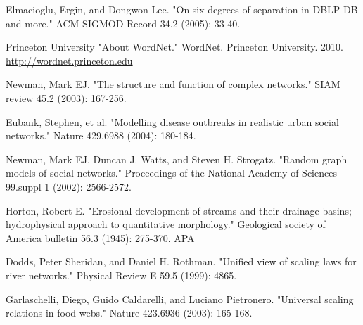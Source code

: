 \documentclass[pre,twocolumn,twoside,superscriptaddress,floatfix, aps, 10pt]{revtex4-1}
\begin{document}
\begin{thebibliography}{1}
     Elmacioglu, Ergin, and Dongwon Lee. "On six degrees of separation in DBLP-DB and more." ACM SIGMOD Record 34.2 (2005): 33-40.

     Princeton University "About WordNet." WordNet. Princeton University. 2010. 
    \url{http://wordnet.princeton.edu}

     Newman, Mark EJ. "The structure and function of complex networks." SIAM review 45.2 (2003): 167-256.

     Eubank, Stephen, et al. "Modelling disease outbreaks in realistic urban social networks." Nature 429.6988 (2004): 180-184.

     Newman, Mark EJ, Duncan J. Watts, and Steven H. Strogatz. "Random graph models of social networks." Proceedings of the National Academy of Sciences 99.suppl 1 (2002): 2566-2572.

     Horton, Robert E. "Erosional development of streams and their drainage basins; hydrophysical approach to quantitative morphology." Geological society of America bulletin 56.3 (1945): 275-370.
    APA

     Dodds, Peter Sheridan, and Daniel H. Rothman. "Unified view of scaling laws for river networks." Physical Review E 59.5 (1999): 4865.

     Garlaschelli, Diego, Guido Caldarelli, and Luciano Pietronero. "Universal scaling relations in food webs." Nature 423.6936 (2003): 165-168.

\end{thebibliography}
\end{document}
